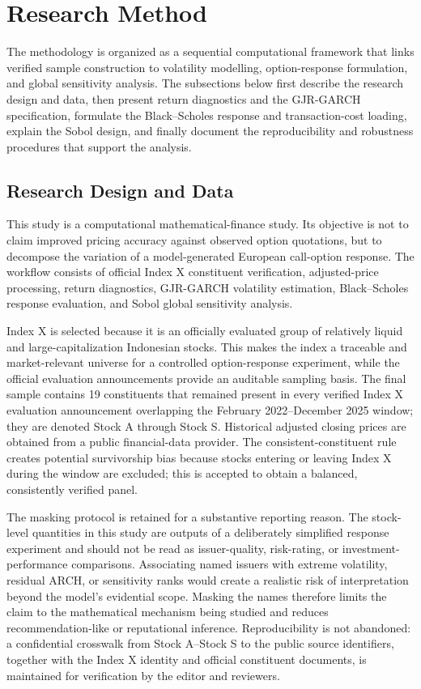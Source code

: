 \section{Research Method}
\label{sec:research-method}

The methodology is organized as a sequential computational framework that links verified sample construction to volatility modelling, option-response formulation, and global sensitivity analysis. The subsections below first describe the research design and data, then present return diagnostics and the GJR-GARCH specification, formulate the Black--Scholes response and transaction-cost loading, explain the Sobol design, and finally document the reproducibility and robustness procedures that support the analysis.

\subsection{Research Design and Data}
\label{subsec:research-design}

This study is a computational mathematical-finance study. Its objective is not to claim improved pricing accuracy against observed option quotations, but to decompose the variation of a model-generated European call-option response. The workflow consists of official Index X constituent verification, adjusted-price processing, return diagnostics, GJR-GARCH volatility estimation, Black--Scholes response evaluation, and Sobol global sensitivity analysis.

Index X is selected because it is an officially evaluated group of relatively liquid and large-capitalization Indonesian stocks. This makes the index a traceable and market-relevant universe for a controlled option-response experiment, while the official evaluation announcements provide an auditable sampling basis. The final sample contains 19 constituents that remained present in every verified Index X evaluation announcement overlapping the February 2022--December 2025 window; they are denoted Stock A through Stock S. Historical adjusted closing prices are obtained from a public financial-data provider. The consistent-constituent rule creates potential survivorship bias because stocks entering or leaving Index X during the window are excluded; this is accepted to obtain a balanced, consistently verified panel.

The masking protocol is retained for a substantive reporting reason. The stock-level quantities in this study are outputs of a deliberately simplified response experiment and should not be read as issuer-quality, risk-rating, or investment-performance comparisons. Associating named issuers with extreme volatility, residual ARCH, or sensitivity ranks would create a realistic risk of interpretation beyond the model's evidential scope. Masking the names therefore limits the claim to the mathematical mechanism being studied and reduces recommendation-like or reputational inference. Reproducibility is not abandoned: a confidential crosswalk from Stock A--Stock S to the public source identifiers, together with the Index X identity and official constituent documents, is maintained for verification by the editor and reviewers.

